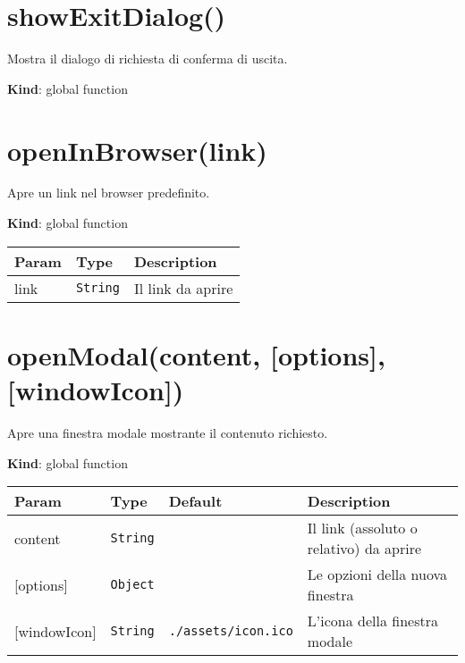 \protect\hypertarget{showExitDialog}{}{}

\hypertarget{showexitdialog}{%
\section{showExitDialog()}\label{showexitdialog}}

Mostra il dialogo di richiesta di conferma di uscita.

\textbf{Kind}: global function\\
\protect\hypertarget{openInBrowser}{}{}

\hypertarget{openinbrowserlink}{%
\section{openInBrowser(link)}\label{openinbrowserlink}}

Apre un link nel browser predefinito.

\textbf{Kind}: global function

\begin{longtabu} to \textwidth {X[1,L,m]X[1,L,m]X[1.5,L,m]}
\toprule
Param & Type & Description\tabularnewline
\midrule
\endhead
link & \texttt{String} & Il link da aprire\tabularnewline
\bottomrule
\end{longtabu}

\protect\hypertarget{openModal}{}{}

\hypertarget{openmodalcontent-options-windowicon}{%
\section{openModal(content, {[}options{]},
{[}windowIcon{]})}\label{openmodalcontent-options-windowicon}}

Apre una finestra modale mostrante il contenuto richiesto.

\textbf{Kind}: global function

\begin{longtabu} to \textwidth {X[1,L,m]X[1,L,m]X[1.5,L,m]X[1.5,L,m]}
\toprule
Param & Type & Default & Description\tabularnewline
\midrule
\endhead
content & \texttt{String} & & Il link (assoluto o relativo) da
aprire\tabularnewline
{[}options{]} & \texttt{Object} & & Le opzioni della nuova
finestra\tabularnewline
{[}windowIcon{]} & \texttt{String} & \texttt{./assets/icon.ico} &
L'icona della finestra modale\tabularnewline
\bottomrule
\end{longtabu}

\protect\hypertarget{openOnKeyboardShortcut}{}{}


